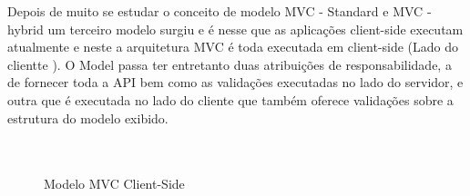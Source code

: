 Depois de muito se estudar o conceito de modelo MVC - Standard e MVC - hybrid um terceiro modelo surgiu e é nesse que as aplicações client-side executam atualmente e neste a arquitetura
MVC é toda executada em client-side (Lado do clientte ). O Model passa ter entretanto duas atribuições de responsabilidade, a de fornecer toda a API bem como as validações executadas no
lado do servidor, e outra que é executada no lado do cliente que também oferece validações sobre a estrutura do modelo exibido.
\\\\\\
\begin{figure}[ht]
    \centering
    \caption{Modelo MVC Client-Side}
    \label{submeter}
\end{figure}

